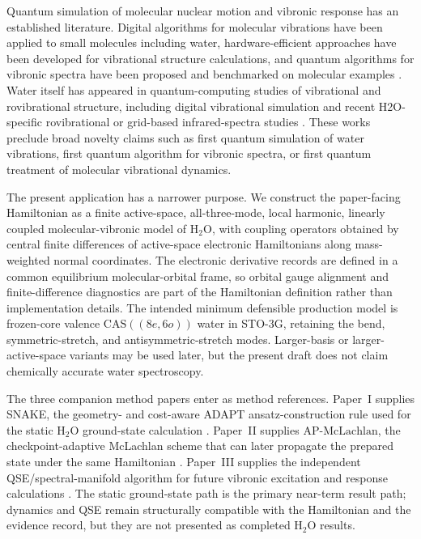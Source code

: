 \documentclass[
  reprint,
  amsmath,
  amssymb,
  aps,
  pra,
  nofootinbib,
  superscriptaddress,
  floatfix
]{revtex4-2}
\newcommand{\CAS}{\mathrm{CAS}}
\newcommand{\HtwoO}{\mathrm{H_2O}}
\newcommand{\APM}{\mathrm{AP}\text{-}\mathrm{McLachlan}}
\begin{document}
Quantum simulation of molecular nuclear motion and vibronic response has an established literature.  Digital algorithms for molecular vibrations have been applied to small molecules including water, hardware-efficient approaches have been developed for vibrational structure calculations, and quantum algorithms for vibronic spectra have been proposed and benchmarked on molecular examples \cite{McArdle2019Vibrations,Ollitrault2020Vibrational,SawayaHuh2019Vibronic,MacDonell2023AnalogVibronic}.  Water itself has appeared in quantum-computing studies of vibrational and rovibrational structure, including digital vibrational simulation and recent H2O-specific rovibrational or grid-based infrared-spectra studies \cite{McArdle2019Vibrations,LotstedtSzidarovszky2026H2O,Feng2026GridIR,LotstedtYamanouchi2026VibDynamics}.  These works preclude broad novelty claims such as first quantum simulation of water vibrations, first quantum algorithm for vibronic spectra, or first quantum treatment of molecular vibrational dynamics.

The present application has a narrower purpose.  We construct the paper-facing Hamiltonian as a finite active-space, all-three-mode, local harmonic, linearly coupled molecular-vibronic model of \(\HtwoO\), with coupling operators obtained by central finite differences of active-space electronic Hamiltonians along mass-weighted normal coordinates.  The electronic derivative records are defined in a common equilibrium molecular-orbital frame, so orbital gauge alignment and finite-difference diagnostics are part of the Hamiltonian definition rather than implementation details.  The intended minimum defensible production model is frozen-core valence \(\CAS((8e,6o))\) water in STO-3G, retaining the bend, symmetric-stretch, and antisymmetric-stretch modes.  Larger-basis or larger-active-space variants may be used later, but the present draft does not claim chemically accurate water spectroscopy.

The three companion method papers enter as method references.  Paper~I supplies SNAKE, the geometry- and cost-aware ADAPT ansatz-construction rule used for the static \(\HtwoO\) ground-state calculation \cite{StrobelPaperIStaticADAPT}.  Paper~II supplies \(\APM\), the checkpoint-adaptive McLachlan scheme that can later propagate the prepared state under the same Hamiltonian \cite{StrobelPaperIIMcLachlan}.  Paper~III supplies the independent QSE/spectral-manifold algorithm for future vibronic excitation and response calculations \cite{StrobelPaperIIIQSE}.  The static ground-state path is the primary near-term result path; dynamics and QSE remain structurally compatible with the Hamiltonian and the evidence record, but they are not presented as completed \(\HtwoO\) results.
\end{document}
